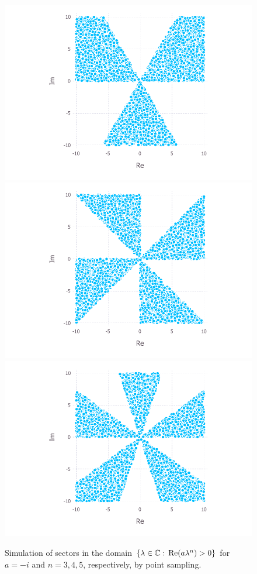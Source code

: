\documentclass[11pt, oneside, a4paper]{article}
\begin{document}
\begin{figure}[htpb!]
      \includegraphics[width=\linewidth]{contourTracing_a=-i_n=3.pdf}
    \endminipage\hfill
      \includegraphics[width=\linewidth]{contourTracing_a=-i_n=4.pdf}
    \endminipage\hfill
      \includegraphics[width=\linewidth]{coutourTracing_a=-i_n=5.pdf}
    \endminipage
    \caption{Simulation of sectors in the domain $\{\lambda\in\mathbb C:\,\mathrm{Re}(a\lambda^n)>0\}$ for $a=-i$ and $n=3, 4, 5$, respectively, by point sampling.}
    \label{fig:contourTracing}
\end{figure}
\end{document}
